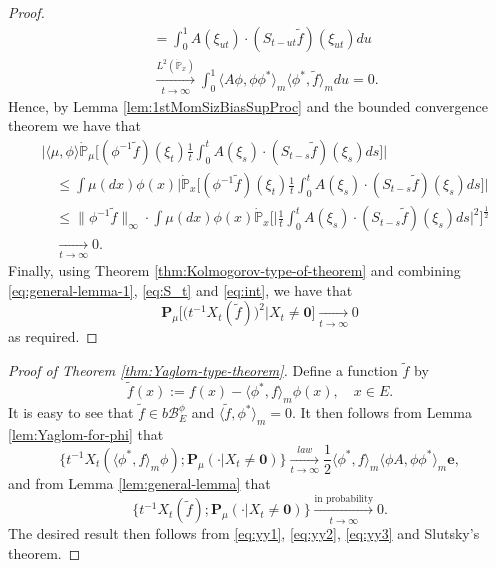 \documentclass[UTF8]{pkuthss}
\theoremstyle{plain}
\theoremstyle{definition}
\numberwithin{equation}{section}
\begin{document}
\begin{proof}
\[\begin{split}
	&= \int_0^1 A(\xi_{ut})\cdot (S_{t-ut} \tilde f)(\xi_{ut})d{u}\\
    &\xrightarrow[t\to\infty]{L^2(\dot{\mathbb P}_x)} \int_0^1\langle A\phi,\phi\phi^*\rangle_m \langle\phi^*,\tilde f\rangle_m du
	= 0.
\end{split}\]
	Hence, by Lemma \ref{lem:1stMomSizBiasSupProc} and the bounded convergence theorem we have that
\begin{equation}\label{eq:int}\begin{split}
	&\big| \langle \mu , \phi \rangle \dot{\mathbb P}_{\mu}\big[(\phi^{-1}\tilde f)(\xi_t)\frac{1}{t}\int_0^t A(\xi_s)\cdot (S_{t-s} \tilde f)(\xi_s)ds\big]\big|\\
	&\quad\leq \int \mu(dx)\phi(x) \big|\dot{\mathbb P}_x \big[(\phi^{-1}\tilde f)(\xi_t)\frac{1}{t}\int_0^t A(\xi_s)\cdot (S_{t-s} \tilde f)(\xi_s)ds\big]\big| \\
	&\quad\leq \|\phi^{-1} \tilde f\|_\infty \cdot \int \mu(dx)\phi(x) \dot{\mathbb P}_{x}\Big[ \big| \frac{1}{t}\int_0^t A(\xi_s)\cdot (S_{t-s} \tilde f)(\xi_s)ds \big|^2 \Big]^{\frac{1}{2}}\\
	&\quad \xrightarrow[t\to\infty]{} 0.
\end{split}\end{equation}
	Finally, using  Theorem \ref{thm:Kolmogorov-type-of-theorem} and combining  \eqref{eq:general-lemma-1}, \eqref{eq:S_t} and  \eqref{eq:int},   we have that
\[
	\mathbf P_{\mu}\big[\big(t^{-1}X_t(\tilde f)\big)^2\big|X_t \neq \mathbf 0\big]
	\xrightarrow[t\to\infty]{} 0
\]
	as required.
\end{proof}
\begin{proof}[Proof of Theorem \ref{thm:Yaglom-type-theorem}]
	Define a function $\tilde f$ by
\begin{equation}\label{eq:yy1}
	\tilde f(x)
	:=f(x) - \langle \phi^*,f\rangle_m \phi(x),
	\quad x\in E.
\end{equation}
	It is easy to see that $\tilde f\in b\mathscr B^\phi_E$ and $\langle\tilde f,\phi^* \rangle_m = 0$.
	It then follows from Lemma \ref{lem:Yaglom-for-phi} that
\begin{equation}\label{eq:yy2}
	\big\{ t^{-1}X_t(\langle \phi^*,f\rangle_m \phi);\mathbf P_\mu(\cdot | X_t\neq \mathbf 0)\big\}
	\xrightarrow[t\to\infty]{law} \frac{1}{2}\langle \phi^*,f\rangle_m\langle \phi A, \phi\phi^*\rangle_m \mathbf e,
\end{equation}
	and from Lemma \ref{lem:general-lemma} that
\begin{equation}\label{eq:yy3}
	\big\{ t^{-1} X_t(\tilde f) ; \mathbf P_\mu(\cdot|X_t \neq \mathbf 0)\big\}
	\xrightarrow[t\to\infty]{\text{in probability}}0.
\end{equation}
	The desired result then follows from \eqref{eq:yy1}, \eqref{eq:yy2}, \eqref{eq:yy3} and Slutsky's theorem.
\end{proof}
\end{document}
